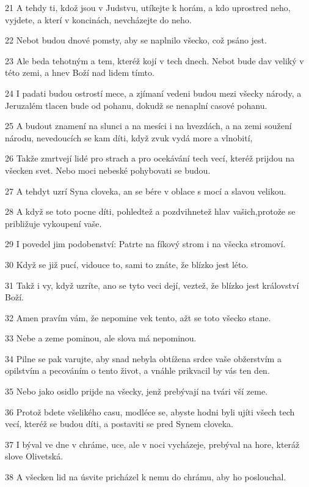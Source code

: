 \par 21 A tehdy ti, kdož jsou v Judstvu, utíkejte k horám, a kdo uprostred neho, vyjdete, a kterí v koncinách, nevcházejte do neho.
\par 22 Nebot budou dnové pomsty, aby se naplnilo všecko, což psáno jest.
\par 23 Ale beda tehotným a tem, kteréž kojí v tech dnech. Nebot bude dav veliký v této zemi, a hnev Boží nad lidem tímto.
\par 24 I padati budou ostrostí mece, a zjímaní vedeni budou mezi všecky národy, a Jeruzalém tlacen bude od pohanu, dokudž se nenaplní casové pohanu.
\par 25 A budout znamení na slunci a na mesíci i na hvezdách, a na zemi soužení národu, nevedoucích se kam díti, když zvuk vydá more a vlnobití,
\par 26 Takže zmrtvejí lidé pro strach a pro ocekávání tech vecí, kteréž prijdou na všecken svet. Nebo moci nebeské pohybovati se budou.
\par 27 A tehdyt uzrí Syna cloveka, an se bére v oblace s mocí a slavou velikou.
\par 28 A když se toto pocne díti, pohledtež a pozdvihnetež hlav vašich,protože se približuje vykoupení vaše.
\par 29 I povedel jim podobenství: Patrte na fíkový strom i na všecka stromoví.
\par 30 Když se již pucí, vidouce to, sami to znáte, že blízko jest léto.
\par 31 Takž i vy, když uzríte, ano se tyto veci dejí, veztež, že blízko jest království Boží.
\par 32 Amen pravím vám, že nepomine vek tento, ažt se toto všecko stane.
\par 33 Nebe a zeme pominou, ale slova má nepominou.
\par 34 Pilne se pak varujte, aby snad nebyla obtížena srdce vaše obžerstvím a opilstvím a pecováním o tento život, a vnáhle prikvacil by vás ten den.
\par 35 Nebo jako osidlo prijde na všecky, jenž prebývají na tvári vší zeme.
\par 36 Protož bdete všelikého casu, modléce se, abyste hodni byli ujíti všech tech vecí, kteréž se budou díti, a postaviti se pred Synem cloveka.
\par 37 I býval ve dne v chráme, uce, ale v noci vycházeje, prebýval na hore, kteráž slove Olivetská.
\par 38 A všecken lid na úsvite pricházel k nemu do chrámu, aby ho poslouchal.

